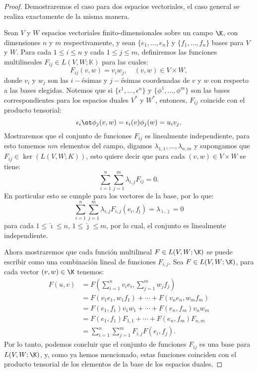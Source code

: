 \begin{proof}
	Demostraremos el caso para dos espacios vectoriales, el caso general se
	realiza exactamente de la misma manera.

	Sean $V$ y $W$ espacios vectoriales finito-dimensionales sobre un campo
	$\K$, con dimensiones $n$ y $m$ respectivamente, y sean $\{e_1,
		\ldots, e_n\}$ y $\{f_1, \ldots, f_n\}$ bases para $V$ y $W$. Para cada
	$1 \leq i \leq n$ y cada $1 \leq j \leq m$, definiremos las funciones
	multilineales $F_{ij} \in L(V,W;\mathbb{K})$ para las cuales:
	\[
		F_{ij} (v,w) = v_i w_j, \quad (v,w) \in V \times W,
	\]
	donde $v_i$ y $w_j$ son las $i-$ésimas y $j-$ésimas coordenadas de $v$ y $w$
	con respecto a las bases elegidas. Notemos que si $\{\epsilon^{1}, \ldots,
		\epsilon^{n}\}$ y $\{\phi^{1}, \ldots, \phi^{m}\}$ son las bases
	correspondientes  para los espacios duales $V^{*}$ y $W^{*}$, entonces,
	$F_{ij}$ coincide con el producto tensorial:
	\[
		\epsilon_{i} \ot \phi_{j} (v,w) = \epsilon_{i}(v) \phi_{j}(w)
		= u_{i}v_{j}.
	\]
	Mostraremos que el conjunto de funciones $F_{ij}$ es linealmente
	independiente, para esto tomemos $nm$ elementos del campo, digamos
	$\lambda_{1,1}, \ldots, \lambda_{n,m}$ y supongamos que $F_{ij} \in
		\ker\left(L(V,W;K)\right)$, esto quiere decir que para cada $(v,w) \in
		V \times W$ se tiene:
	\[
		\sum_{i=1}^{n}\sum_{j=1}^{m} \lambda_{i,j} F_{ij} = 0.
	\]
	En particular esto se cumple para los vectores de la base, por lo que:
	\[
		\sum_{i=1}^{n}\sum_{j=1}^{m}\lambda_{i,j}F_{i,j}(e_{\hat{\imath}}, f_{\hat{\jmath}})
		= \lambda_{\hat{\imath},\hat{\jmath}} = 0
	\]
	para cada $1 \leq \hat{\imath} \leq n$, $1 \leq \hat{\jmath} \leq m$, por lo cual, el
	conjunto es linealmente independiente.

	Ahora mostraremos que cada función multilineal $F \in L(V,W;\K)$
	se puede escribir como una combinación lineal de funciones $F_{i,j}$. Sea
	$F \in L(V,W;\K)$, para cada vector $(v,w) \in \K$ tenemos:
	\begin{align*}
		F(u,v) & = F\left(\sum_{i=1}^n v_i e_i,\sum_{j=1}^m w_j f_j \right) \\
		       & = F(v_1 e_1, w_1 f_1) + \cdots + F(v_n e_n, w_m f_m)       \\
		       & = F(e_1,f_1)v_1w_1 + \cdots + F(e_n,f_m) v_n w_m           \\
		       & = F(e_1,f_1)F_{1,1} + \cdots + F(e_n,f_m) F_{n,m}          \\
		       & = \sum_{i=1}^{n} \sum_{j=1}^{m} F_{i,j} F(e_i,f_j).
	\end{align*}
	Por lo tanto, podemos concluir que el conjunto de funciones $F_{ij}$ es
	una base para $L(V,W;\K)$, y, como ya hemos mencionado, estas
	funciones coinciden con el producto tensorial de los elementos de la base
	de los espacios duales.
\end{proof}

